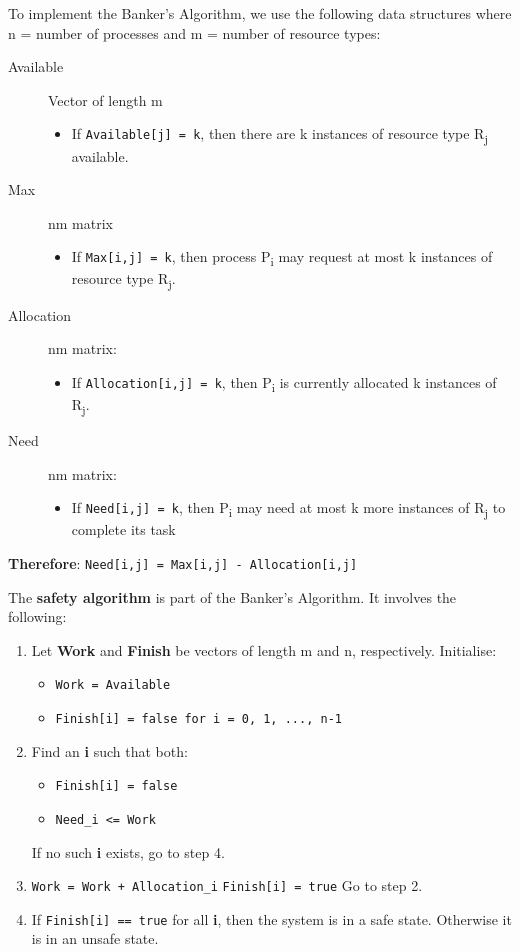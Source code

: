 \documentclass{article}%
\begin{document}
\begin{enumerate}
To implement the Banker's Algorithm, we use the following data structures where n = number of processes and m = number of resource types:
\begin{description}
\item[{Available}] Vector of length m
\begin{itemize}
\item If \texttt{Available[j] = k}, then there are k instances of resource type R\textsubscript{j} available.
\end{itemize}
\item[{Max}] nm matrix
\begin{itemize}
\item If \texttt{Max[i,j] = k}, then process P\textsubscript{i} may request at most k instances of resource type R\textsubscript{j}.
\end{itemize}
\item[{Allocation}] nm matrix:
\begin{itemize}
\item If \texttt{Allocation[i,j] = k}, then P\textsubscript{i} is currently allocated k instances of R\textsubscript{j}.
\end{itemize}
\item[{Need}] nm matrix:
\begin{itemize}
\item If \texttt{Need[i,j] = k}, then P\textsubscript{i} may need at most k more instances of R\textsubscript{j} to complete its task
\end{itemize}
\end{description}

\textbf{Therefore}: \texttt{Need[i,j] = Max[i,j] - Allocation[i,j]}

The \textbf{safety algorithm} is part of the Banker's Algorithm.
It involves the following:
\begin{enumerate}
\item Let \textbf{Work} and \textbf{Finish} be vectors of length m and n, respectively.
Initialise:
\begin{itemize}
\item \texttt{Work = Available}
\item \texttt{Finish[i] = false for i = 0, 1, ..., n-1}
\end{itemize}
\item Find an \textbf{i} such that both:
\begin{itemize}
\item \texttt{Finish[i] = false}
\item \texttt{Need\_i <= Work}
\end{itemize}
If no such \textbf{i} exists, go to step 4.
\item \texttt{Work = Work + Allocation\_i}
\texttt{Finish[i] = true}
Go to step 2.
\item If \texttt{Finish[i] == true} for all \textbf{i}, then the system is in a safe state. Otherwise it is in an unsafe state.
\end{enumerate}
\end{enumerate}
\end{document}
